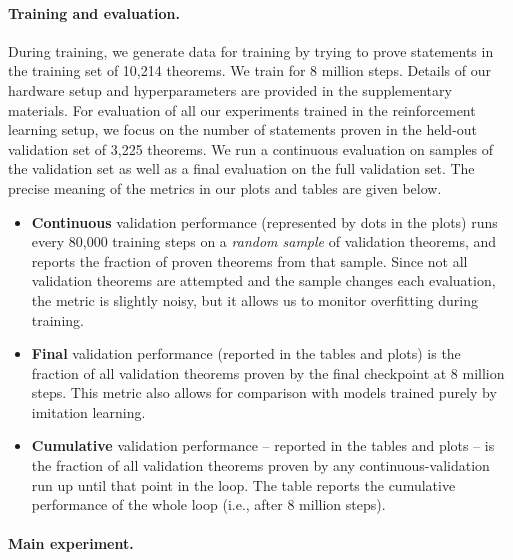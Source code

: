 \documentclass{article}
\begin{document}
\paragraph{Training and evaluation.}
During training, we generate data for training by trying to prove statements in the
training set of 10,214 theorems.
We train for 8 million steps.
Details of our hardware
setup and hyperparameters are provided in the supplementary materials.
For evaluation of all our experiments trained in the reinforcement learning setup, we focus on the
number of statements proven in the held-out validation set of 3,225 theorems.
We run a continuous evaluation
on samples of the validation set as well as a final evaluation on the full validation set.
The precise meaning of the metrics in our plots and tables are given below.
\begin{itemize}[itemsep=0mm,leftmargin=4mm]
    \item \textbf{Continuous} validation performance (represented by dots in the plots) runs every 80,000 training steps on
    a \emph{random sample} of validation theorems, and reports the fraction of proven theorems from that sample.
    Since not all validation theorems are attempted and the sample changes each evaluation,
    the metric is slightly noisy, but it allows us to monitor overfitting during training.
    \item \textbf{Final} validation performance (reported in the tables and plots) is the fraction of all validation
    theorems proven by the final checkpoint at 8 million steps.
    This metric also allows for comparison with models trained purely by imitation learning.
    \item \textbf{Cumulative} validation
    performance -- reported in the tables and plots -- is the fraction of all validation
    theorems proven by any continuous-validation
    run up until that point in the loop. The table reports the cumulative
    performance of the whole loop (i.e., after 8 million steps).
\end{itemize}

\paragraph{Main experiment.}
\end{document}
